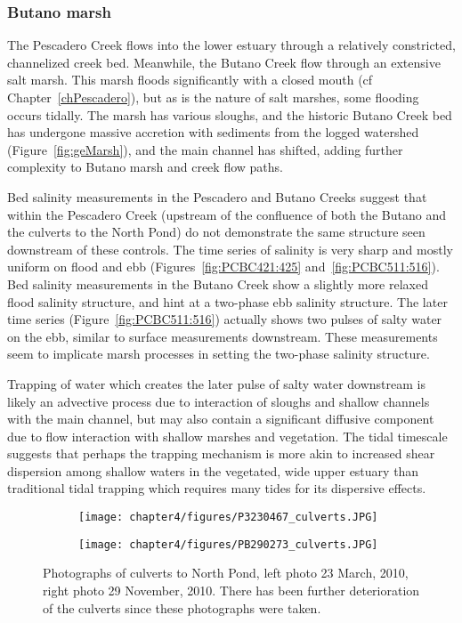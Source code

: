 \subsubsection{Butano marsh}
The Pescadero Creek flows into the lower estuary through a relatively constricted, channelized creek bed.  Meanwhile, the Butano Creek flow through an extensive salt marsh. This marsh floods significantly with a closed mouth (cf Chapter~\ref{chPescadero}), but as is the nature of salt marshes, some flooding occurs tidally. The marsh has various sloughs, and the historic Butano Creek bed has undergone massive accretion with sediments from the logged watershed (Figure~\ref{fig:geMarsh}), and the main channel has shifted, adding further complexity to Butano marsh and creek flow paths.

Bed salinity measurements in the Pescadero and Butano Creeks suggest that within the Pescadero Creek (upstream of the confluence of both the Butano and the culverts to the North Pond) do not demonstrate the same structure seen downstream of these controls. The time series of salinity is very sharp and mostly uniform on flood and ebb (Figures~\ref{fig:PCBC421:425} and~\ref{fig:PCBC511:516}). Bed salinity measurements in the Butano Creek show a slightly more relaxed flood salinity structure, and hint at a two-phase ebb salinity structure. The later time series (Figure~\ref{fig:PCBC511:516}) actually shows two pulses of salty water on the ebb, similar to surface measurements downstream. These measurements seem to implicate marsh processes in setting the two-phase salinity structure.

Trapping of water which creates the later pulse of salty water downstream is likely an advective process due to interaction of sloughs and shallow channels with the main channel, but may also contain a significant diffusive component due to flow interaction with shallow marshes and vegetation. The tidal timescale suggests that perhaps the trapping mechanism is more akin to increased shear dispersion among shallow waters in the vegetated, wide upper estuary than traditional tidal trapping which requires many tides for its dispersive effects. 


\begin{figure}[hp]
\centering
\begin{subfigure}{.48\textwidth}
	\texttt{[image: chapter4/figures/P3230467\_culverts.JPG]}
\end{subfigure}
\begin{subfigure}{.48\textwidth}
	\texttt{[image: chapter4/figures/PB290273\_culverts.JPG]}
\end{subfigure}
\caption{Photographs of culverts to North Pond, left photo 23 March, 2010, right photo 29 November, 2010. There has been further deterioration of the culverts since these photographs were taken.} \label{fig:photoCulverts}
\end{figure}

